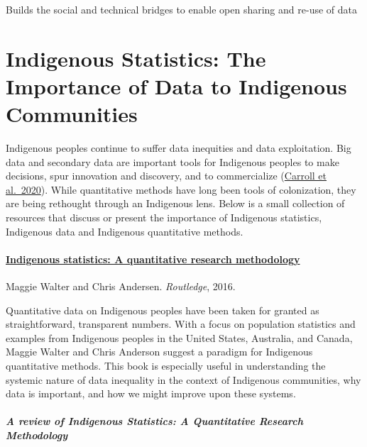 \documentclass[
]{book}
\begin{document}
Builds the social and technical bridges to enable open sharing and re-use of data

\hypertarget{indigenous-statistics-the-importance-of-data-to-indigenous-communities}{%
\chapter{Indigenous Statistics: The Importance of Data to Indigenous Communities}\label{indigenous-statistics-the-importance-of-data-to-indigenous-communities}}

Indigenous peoples continue to suffer data inequities and data exploitation. Big data and secondary data are important tools for Indigenous peoples to make decisions, spur innovation and discovery, and to commercialize (\href{https://repository.oceanbestpractices.org/bitstream/handle/11329/1507/1158-8528-2-PB.pdf?sequence=1\&isAllowed=y}{Carroll et al.~2020}). While quantitative methods have long been tools of colonization, they are being rethought through an Indigenous lens. Below is a small collection of resources that discuss or present the importance of Indigenous statistics, Indigenous data and Indigenous quantitative methods.

\hypertarget{indigenous-statistics-a-quantitative-research-methodology}{%
\subsubsection{\texorpdfstring{\href{https://www.taylorfrancis.com/books/mono/10.4324/9781315426570/indigenous-statistics-maggie-walter-chris-andersen}{Indigenous statistics: A quantitative research methodology}}{Indigenous statistics: A quantitative research methodology}}\label{indigenous-statistics-a-quantitative-research-methodology}}

Maggie Walter and Chris Andersen. \emph{Routledge}, 2016.

Quantitative data on Indigenous peoples have been taken for granted as straightforward, transparent numbers. With a focus on population statistics and examples from Indigenous peoples in the United States, Australia, and Canada, Maggie Walter and Chris Anderson suggest a paradigm for Indigenous quantitative methods. This book is especially useful in understanding the systemic nature of data inequality in the context of Indigenous communities, why data is important, and how we might improve upon these systems.

\hypertarget{a-review-of-indigenous-statistics-a-quantitative-research-methodology}{%
\paragraph*{A review of Indigenous Statistics: A Quantitative Research Methodology}\label{a-review-of-indigenous-statistics-a-quantitative-research-methodology}}
\end{document}
